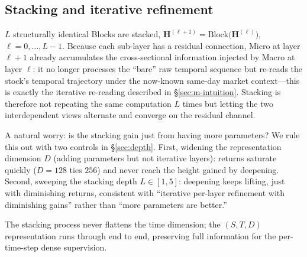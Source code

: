 \documentclass[a4paper,11pt]{article}
\begin{document}
\subsection{Stacking and iterative refinement}\label{sec:m-stack}
$L$ structurally identical Blocks are stacked,
$\bm{H}^{(\ell+1)}=\mathrm{Block}\big(\bm{H}^{(\ell)}\big)$,
$\ell=0,\dots,L-1$. Because each sub-layer has a residual connection, Micro at
layer $\ell{+}1$ already accumulates the cross-sectional information injected
by Macro at layer $\ell$: it no longer processes the ``bare'' raw temporal
sequence but re-reads the stock's temporal trajectory under the now-known
same-day market context---this is exactly the iterative re-reading described
in \S\ref{sec:m-intuition}. Stacking is therefore not repeating the same
computation $L$ times but letting the two interdependent views alternate and
converge on the residual channel.

A natural worry: is the stacking gain just from having more parameters? We rule
this out with two controls in \S\ref{sec:depth}. First, widening the
representation dimension $D$ (adding parameters but not iterative layers):
returns saturate quickly ($D{=}128$ ties $256$) and never reach the height
gained by deepening. Second, sweeping the stacking depth $L\in[1,5]$:
deepening keeps lifting, just with diminishing returns, consistent with
``iterative per-layer refinement with diminishing gains'' rather than ``more
parameters are better.''

The stacking process never flattens the time dimension; the $(S,T,D)$
representation runs through end to end, preserving full information for the
per-time-step dense supervision.
\end{document}
